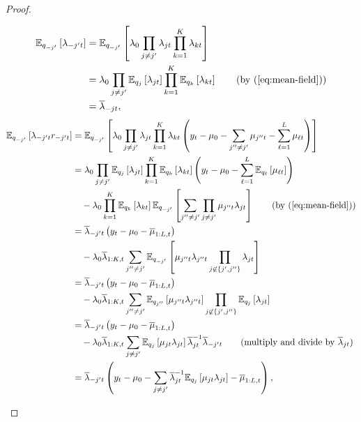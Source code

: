 \begin{proof}
\begin{enumerate}[label=\roman*.]
\footnotesize
\begin{align*}
    \E_{q_{-j'}}\left[\lambda_{-j't}\right] &= \E_{q_{-j'}}\left[\lambda_0\prod_{j \neq j'}\lambda_{jt} \prod_{k=1}^K \lambda_{kt}\right] \\
    &= \lambda_0\prod_{j \neq j'}\E_{q_{j}}\left[\lambda_{jt}\right] \prod_{k=1}^K \E_{q_{k}}\left[\lambda_{kt}\right] \tag{by (\ref{eq:mean-field})} \\
    &= \overline{\lambda}_{-jt}, \\
\end{align*}
\begin{align*}
    \E_{q_{-j'}}\left[\lambda_{-j't}r_{-j't}\right] &= \E_{q_{-j'}}\left[\lambda_0\prod_{j \neq j'}\lambda_{jt} \prod_{k=1}^K \lambda_{kt}\left(y_t - \mu_0 - \sum_{j''\neq j'} \mu_{j''t} - \sum_{\ell=1}^L \mu_{\ell t}\right)\right] \\
    &= \lambda_0\prod_{j \neq j'}\E_{q_{j}}\left[\lambda_{jt}\right] \prod_{k=1}^K \E_{q_{k}}\left[\lambda_{kt}\right]\left(y_t -\mu_0 -\sum_{\ell=1}^L\E_{q_{\ell}}\left[\mu_{\ell t}\right]\right) \\
    &\quad-\lambda_0\prod_{k=1}^K \E_{q_{k}}\left[\lambda_{kt}\right]\E_{q_{-j'}}\left[\sum_{j'' \neq j'}\prod_{j \neq j'} \mu_{j''t}\lambda_{jt}\right]  \tag{by (\ref{eq:mean-field})} \\
    &=  \overline{\lambda}_{-j't} \left(y_t -\mu_0 -\overline{\mu}_{1:L, t}\right) \\
    &\quad-\lambda_0\overline{\lambda}_{1:K,t} \sum_{j'' \neq j'}\E_{q_{-j'}}\left[ \mu_{j''t}\lambda_{j''t}\prod_{j \not\in\{j',j''\}} \lambda_{jt}\right]  \\
    &= \overline{\lambda}_{-j't} \left(y_t -\mu_0 -\overline{\mu}_{1:L, t}\right) \\
    &\quad-\lambda_0\overline{\lambda}_{1:K,t} \sum_{j'' \neq j'}\E_{q_{j''}}\left[ \mu_{j''t}\lambda_{j''t} \right] \prod_{j \not\in\{j',j''\}} \E_{q_{j}}\left[\lambda_{jt}\right] \\
    &= \overline{\lambda}_{-j't} \left(y_t -\mu_0 -\overline{\mu}_{1:L, t}\right) \\
    &\quad-\lambda_0\overline{\lambda}_{1:K,t} \sum_{j \neq j'}\E_{q_{j}}\left[ \mu_{jt}\lambda_{jt} \right] \overline{\lambda}_{jt}^{-1}\overline{\lambda}_{-j't}\tag{multiply and divide by $\overline{\lambda}_{jt}$}\\
    &=\overline{\lambda}_{-j't} \left(y_t -\mu_0 -  \sum_{j \neq j'}\overline{\lambda}_{jt}^{-1}\E_{q_{j}}\left[ \mu_{jt}\lambda_{jt} \right] -\overline{\mu}_{1:L, t}\right), \\

\end{align*}
\end{enumerate}
\end{proof}
